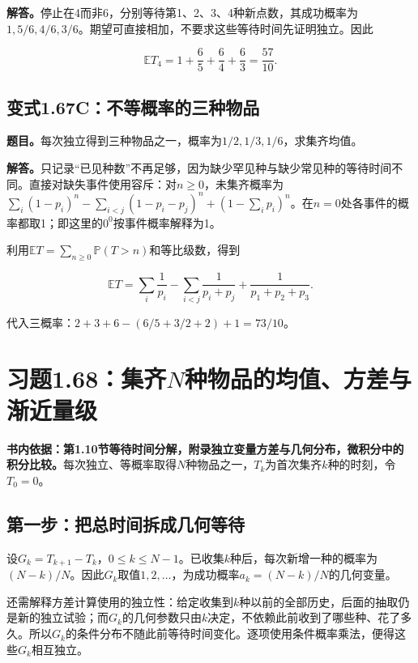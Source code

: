 \documentclass[
  11pt,a4paper,UTF8,fontset=fandol]{ctexart}
\begin{document}
\textbf{解答。}停止在4而非6，分别等待第1、2、3、4种新点数，其成功概率为\(1,5/6,4/6,3/6\)。期望可直接相加，不要求这些等待时间先证明独立。因此

\[\boxed{\mathbb ET_4=1+\frac65+\frac64+\frac63=\frac{57}{10}.}\]

\subsection{变式1.67C：不等概率的三种物品}\label{ux53d8ux5f0f1.67cux4e0dux7b49ux6982ux7387ux7684ux4e09ux79cdux7269ux54c1}

\textbf{题目。}每次独立得到三种物品之一，概率为\(1/2,1/3,1/6\)，求集齐均值。

\textbf{解答。}只记录``已见种数''不再足够，因为缺少罕见种与缺少常见种的等待时间不同。直接对缺失事件使用容斥：对\(n\ge0\)，未集齐概率为\(\sum_i(1-p_i)^n-\sum_{i<j}(1-p_i-p_j)^n+(1-\sum_i p_i)^n\)。在\(n=0\)处各事件的概率都取1；即这里的\(0^0\)按事件概率解释为1。

利用\(\mathbb ET=\sum_{n\ge0}\mathbb P(T>n)\)和等比级数，得到

\[\mathbb ET=\sum_i\frac1{p_i}-\sum_{i<j}\frac1{p_i+p_j}+\frac1{p_1+p_2+p_3}.\]

代入三概率：\(2+3+6-(6/5+3/2+2)+1=\boxed{73/10}\)。

\section{\texorpdfstring{习题1.68：集齐\(N\)种物品的均值、方差与渐近量级}{习题1.68：集齐N种物品的均值、方差与渐近量级}}\label{ux4e60ux98981.68ux96c6ux9f50nux79cdux7269ux54c1ux7684ux5747ux503cux65b9ux5deeux4e0eux6e10ux8fd1ux91cfux7ea7}

\textbf{书内依据：第1.10节等待时间分解，附录独立变量方差与几何分布，微积分中的积分比较。}每次独立、等概率取得\(N\)种物品之一，\(T_k\)为首次集齐\(k\)种的时刻，令\(T_0=0\)。

\subsection{第一步：把总时间拆成几何等待}\label{ux7b2cux4e00ux6b65ux628aux603bux65f6ux95f4ux62c6ux6210ux51e0ux4f55ux7b49ux5f85}

设\(G_k=T_{k+1}-T_k\)，\(0\le k\le N-1\)。已收集\(k\)种后，每次新增一种的概率为\((N-k)/N\)。因此\(G_k\)取值\(1,2,\ldots\)，为成功概率\(a_k=(N-k)/N\)的几何变量。

还需解释方差计算使用的独立性：给定收集到\(k\)种以前的全部历史，后面的抽取仍是新的独立试验；而\(G_k\)的几何参数只由\(k\)决定，不依赖此前收到了哪些种、花了多久。所以\(G_k\)的条件分布不随此前等待时间变化。逐项使用条件概率乘法，便得这些\(G_k\)相互独立。
\end{document}
